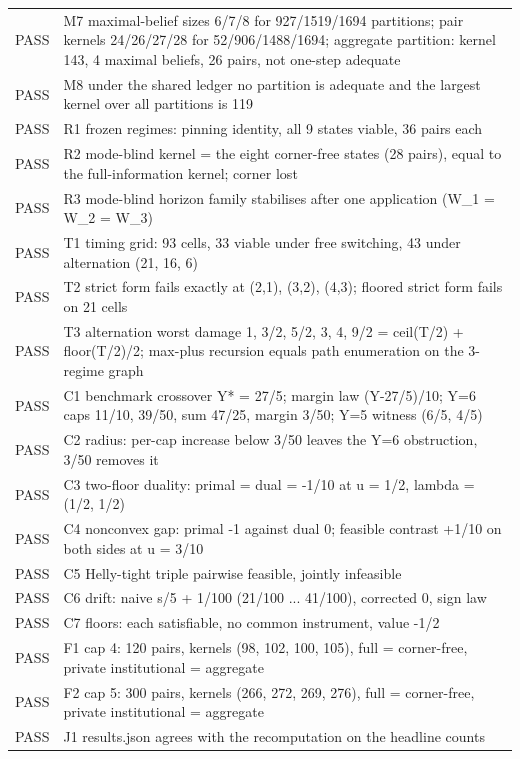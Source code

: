 \documentclass[11pt,a4paper]{article}
\theoremstyle{plain}
\theoremstyle{definition}
\theoremstyle{remark}
\begin{document}
\begin{longtable}{lp{}}
PASS & M7 maximal-belief sizes 6/7/8 for 927/1519/1694 partitions; pair kernels 24/26/27/28 for 52/906/1488/1694; aggregate partition: kernel 143, 4 maximal beliefs, 26 pairs, not one-step adequate \\
PASS & M8 under the shared ledger no partition is adequate and the largest kernel over all partitions is 119 \\
PASS & R1 frozen regimes: pinning identity, all 9 states viable, 36 pairs each \\
PASS & R2 mode-blind kernel = the eight corner-free states (28 pairs), equal to the full-information kernel; corner lost \\
PASS & R3 mode-blind horizon family stabilises after one application (W\_1 = W\_2 = W\_3) \\
PASS & T1 timing grid: 93 cells, 33 viable under free switching, 43 under alternation (21, 16, 6) \\
PASS & T2 strict form fails exactly at (2,1), (3,2), (4,3); floored strict form fails on 21 cells \\
PASS & T3 alternation worst damage 1, 3/2, 5/2, 3, 4, 9/2 = ceil(T/2) + floor(T/2)/2; max-plus recursion equals path enumeration on the 3-regime graph \\
PASS & C1 benchmark crossover Y* = 27/5; margin law (Y-27/5)/10; Y=6 caps 11/10, 39/50, sum 47/25, margin 3/50; Y=5 witness (6/5, 4/5) \\
PASS & C2 radius: per-cap increase below 3/50 leaves the Y=6 obstruction, 3/50 removes it \\
PASS & C3 two-floor duality: primal = dual = -1/10 at u = 1/2, lambda = (1/2, 1/2) \\
PASS & C4 nonconvex gap: primal -1 against dual 0; feasible contrast +1/10 on both sides at u = 3/10 \\
PASS & C5 Helly-tight triple pairwise feasible, jointly infeasible \\
PASS & C6 drift: naive s/5 + 1/100 (21/100 ... 41/100), corrected 0, sign law \\
PASS & C7 floors: each satisfiable, no common instrument, value -1/2 \\
PASS & F1 cap 4: 120 pairs, kernels (98, 102, 100, 105), full = corner-free, private institutional = aggregate \\
PASS & F2 cap 5: 300 pairs, kernels (266, 272, 269, 276), full = corner-free, private institutional = aggregate \\
PASS & J1 results.json agrees with the recomputation on the headline counts \\

\end{longtable}
\end{document}
